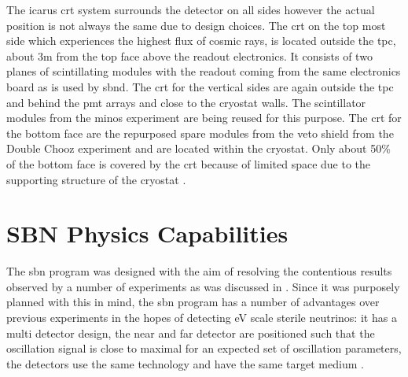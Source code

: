 The \gls{icarus} \gls{crt} system surrounds the detector on all sides however the actual position is not always the same due to design choices. The \gls{crt} on the top most side which experiences the highest flux of cosmic rays, is located outside the \gls{tpc}, about 3m from the top face above the readout electronics. It consists of two planes of scintillating modules with the readout coming from the same electronics board as is used by \gls{sbnd}.
The \gls{crt} for the vertical sides are again outside the \gls{tpc} and behind the \gls{pmt} arrays and close to the cryostat walls. The scintillator modules from the \gls{minos} experiment are being reused for this purpose. The \gls{crt} for the bottom face are the repurposed spare modules from the veto shield from the Double Chooz experiment and are located within the cryostat. Only about 50\% of the bottom face is covered by the \gls{crt} because of limited space due to the supporting structure of the cryostat \cite{SBN_Proposal}\cite{ICARUS_CRT}.


\section{SBN Physics Capabilities}

The \gls{sbn} program was designed with the aim of resolving the contentious results observed by a number of experiments as was discussed in . Since it was purposely planned with this in mind, the \gls{sbn} program has a number of advantages over previous experiments in the hopes of detecting eV scale sterile neutrinos: it has a multi detector design, the near and far detector are positioned such that the oscillation signal is close to maximal for an expected set of oscillation parameters, the detectors use the same technology and have the same target medium \cite{SBN_paper}. 

